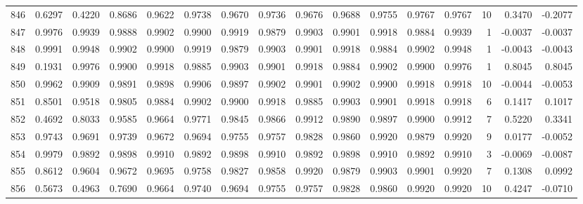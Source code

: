 \begin{tabular}{lrrrrrrrrrrrrrrr}
846 &      0.6297 &  0.4220 &  0.8686 &  0.9622 &  0.9738 &  0.9670 &  0.9736 &  0.9676 &  0.9688 &  0.9755 &   0.9767 &     0.9767 &     10 &                    0.3470 &                    -0.2077 \\
847 &      0.9976 &  0.9939 &  0.9888 &  0.9902 &  0.9900 &  0.9919 &  0.9879 &  0.9903 &  0.9901 &  0.9918 &   0.9884 &     0.9939 &      1 &                   -0.0037 &                    -0.0037 \\
848 &      0.9991 &  0.9948 &  0.9902 &  0.9900 &  0.9919 &  0.9879 &  0.9903 &  0.9901 &  0.9918 &  0.9884 &   0.9902 &     0.9948 &      1 &                   -0.0043 &                    -0.0043 \\
849 &      0.1931 &  0.9976 &  0.9900 &  0.9918 &  0.9885 &  0.9903 &  0.9901 &  0.9918 &  0.9884 &  0.9902 &   0.9900 &     0.9976 &      1 &                    0.8045 &                     0.8045 \\
850 &      0.9962 &  0.9909 &  0.9891 &  0.9898 &  0.9906 &  0.9897 &  0.9902 &  0.9901 &  0.9902 &  0.9900 &   0.9918 &     0.9918 &     10 &                   -0.0044 &                    -0.0053 \\
851 &      0.8501 &  0.9518 &  0.9805 &  0.9884 &  0.9902 &  0.9900 &  0.9918 &  0.9885 &  0.9903 &  0.9901 &   0.9918 &     0.9918 &      6 &                    0.1417 &                     0.1017 \\
852 &      0.4692 &  0.8033 &  0.9585 &  0.9664 &  0.9771 &  0.9845 &  0.9866 &  0.9912 &  0.9890 &  0.9897 &   0.9900 &     0.9912 &      7 &                    0.5220 &                     0.3341 \\
853 &      0.9743 &  0.9691 &  0.9739 &  0.9672 &  0.9694 &  0.9755 &  0.9757 &  0.9828 &  0.9860 &  0.9920 &   0.9879 &     0.9920 &      9 &                    0.0177 &                    -0.0052 \\
854 &      0.9979 &  0.9892 &  0.9898 &  0.9910 &  0.9892 &  0.9898 &  0.9910 &  0.9892 &  0.9898 &  0.9910 &   0.9892 &     0.9910 &      3 &                   -0.0069 &                    -0.0087 \\
855 &      0.8612 &  0.9604 &  0.9672 &  0.9695 &  0.9758 &  0.9827 &  0.9858 &  0.9920 &  0.9879 &  0.9903 &   0.9901 &     0.9920 &      7 &                    0.1308 &                     0.0992 \\
856 &      0.5673 &  0.4963 &  0.7690 &  0.9664 &  0.9740 &  0.9694 &  0.9755 &  0.9757 &  0.9828 &  0.9860 &   0.9920 &     0.9920 &     10 &                    0.4247 &                    -0.0710 \\

\end{tabular}
